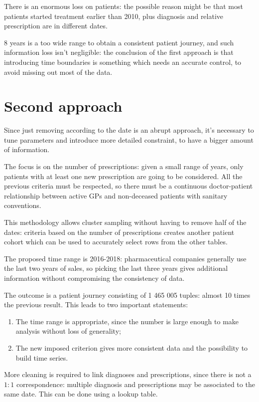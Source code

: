 There is an enormous loss on patients: the possible reason might be that most patients started treatment earlier than 2010, plus diagnosis and relative prescription are in different dates.

8 years is a too wide range to obtain a consistent patient journey, and such information loss isn't negligible: the conclusion of the first approach is that introducing time boundaries is something which needs an accurate control, to avoid missing out most of the data.

\newpage
\section{Second approach}
Since just removing according to the date is an abrupt approach, it's necessary to tune parameters and introduce more detailed constraint, to have a bigger amount of information.

The focus is on the number of prescriptions: given a small range of years, only patients with at least one new prescription are going to be considered. All the previous criteria must be respected, so there must be a continuous doctor-patient relationship between active GPs and non-deceased patients with sanitary conventions.

This methodology allows cluster sampling without having to remove half of the dates: criteria based on the number of prescriptions creates another patient cohort which can be used to accurately select rows from the other tables.

The proposed time range is 2016-2018: pharmaceutical companies generally use the last two years of sales, so picking the last three years gives additional information without compromising the consistency of data.

The outcome is a patient journey consisting of 1 465 005 tuples: almost 10 times the previous result. This leads to two important statements:
\begin{enumerate}
	\item The time range is appropriate, since the number is large enough to make analysis without loss of generality;
	\item The new imposed criterion gives more consistent data and the possibility to build time series.
\end{enumerate}

More cleaning is required to link diagnoses and prescriptions, since there is not a $1 : 1$ correspondence: multiple diagnosis and prescriptions may be associated to the same date. This can be done using a lookup table.

